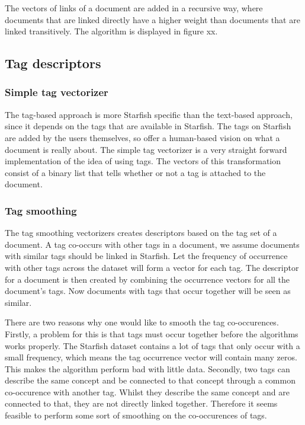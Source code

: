 The vectors of links of a document are added in a recursive way, where documents that are linked directly have a higher weight than documents that are linked transitively. The algorithm is displayed in figure xx.

\subsection{Tag descriptors}
\subsubsection{Simple tag vectorizer}
The tag-based approach is more Starfish specific than the text-based approach, since it depends on the tags that are available in Starfish. The tags on Starfish are added by the users themselves, so offer a human-based vision on what a document is really about. The simple tag vectorizer is a very straight forward implementation of the idea of using tags. The vectors of this transformation consist of a binary list that tells whether or not a tag is attached to the document. 

\subsubsection{Tag smoothing}
The tag smoothing vectorizers creates descriptors based on the tag set of a document. A tag co-occurs with other tags in a document, we assume documents with similar tags should be linked in Starfish. Let the frequency of occurrence with other tags across the dataset will form a vector for each tag. The descriptor for a document is then created by combining the occurrence vectors for all the document's tags. Now documents with tags that occur together will be seen as similar.

There are two reasons why one would like to smooth the tag co-occurences. Firstly, a problem for this is that tags must occur together before the algorithms works properly. The Starfish dataset contains a lot of tags that only occur with a small frequency, which means the tag occurrence vector will contain many zeros. This makes the algorithm perform bad with little data. Secondly, two tags can describe the same concept and be connected to that concept through a common co-occurence with another tag. Whilst they describe the same concept and are connected to that, they are not directly linked together. Therefore it seems feasible to perform some sort of smoothing on the co-occurences of tags.

